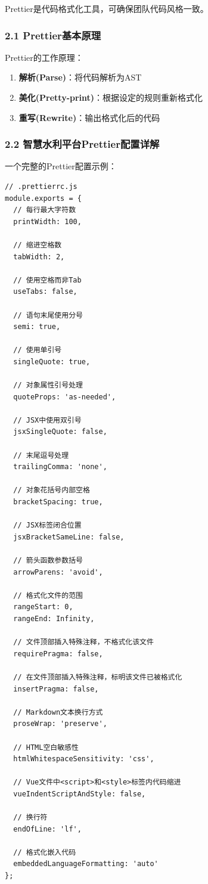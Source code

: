 Prettier是代码格式化工具，可确保团队代码风格一致。

\subsubsection{2.1
Prettier基本原理}\label{prettierux57faux672cux539fux7406}

Prettier的工作原理：

\begin{enumerate}
\def\labelenumi{\arabic{enumi}.}
\tightlist
\item
  \textbf{解析(Parse)}：将代码解析为AST
\item
  \textbf{美化(Pretty-print)}：根据设定的规则重新格式化
\item
  \textbf{重写(Rewrite)}：输出格式化后的代码
\end{enumerate}

\subsubsection{2.2
智慧水利平台Prettier配置详解}\label{ux667aux6167ux6c34ux5229ux5e73ux53f0prettierux914dux7f6eux8be6ux89e3}

一个完整的Prettier配置示例：

\begin{lstlisting}
// .prettierrc.js
module.exports = {
  // 每行最大字符数
  printWidth: 100,
  
  // 缩进空格数
  tabWidth: 2,
  
  // 使用空格而非Tab
  useTabs: false,
  
  // 语句末尾使用分号
  semi: true,
  
  // 使用单引号
  singleQuote: true,
  
  // 对象属性引号处理
  quoteProps: 'as-needed',
  
  // JSX中使用双引号
  jsxSingleQuote: false,
  
  // 末尾逗号处理
  trailingComma: 'none',
  
  // 对象花括号内部空格
  bracketSpacing: true,
  
  // JSX标签闭合位置
  jsxBracketSameLine: false,
  
  // 箭头函数参数括号
  arrowParens: 'avoid',
  
  // 格式化文件的范围
  rangeStart: 0,
  rangeEnd: Infinity,
  
  // 文件顶部插入特殊注释，不格式化该文件
  requirePragma: false,
  
  // 在文件顶部插入特殊注释，标明该文件已被格式化
  insertPragma: false,
  
  // Markdown文本换行方式
  proseWrap: 'preserve',
  
  // HTML空白敏感性
  htmlWhitespaceSensitivity: 'css',
  
  // Vue文件中<script>和<style>标签内代码缩进
  vueIndentScriptAndStyle: false,
  
  // 换行符
  endOfLine: 'lf',
  
  // 格式化嵌入代码
  embeddedLanguageFormatting: 'auto'
};
\end{lstlisting}

